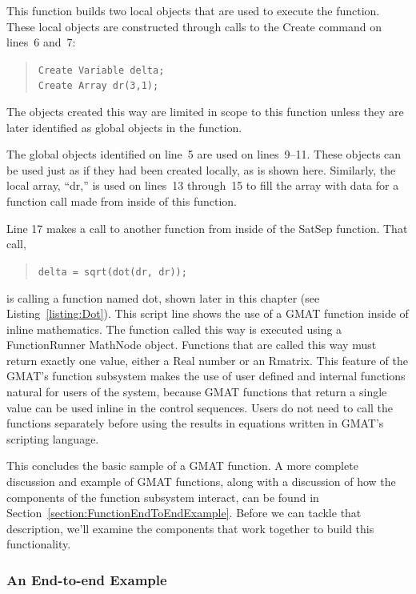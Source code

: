 This function builds two local objects that are used to execute the function.  These local objects
are constructed through calls to the Create command on lines~6 and~7:

\begin{quote}
\texttt{Create Variable delta;\\
Create Array  dr(3,1);}
\end{quote}

\noindent The objects created this way are limited in scope to this function unless they are later
identified as global objects in the function.

The global objects identified on line~5 are used on lines~9--11.  These objects can be used just as
if they had been created locally, as is shown here.  Similarly, the local array, ``dr,'' is used on
lines~13 through~15 to fill the array with data for a function call made from inside of this
function.

Line 17 makes a call to another function from inside of the SatSep function.  That call,

\begin{quote}
\texttt{delta = sqrt(dot(dr, dr));}
\end{quote}

\noindent is calling a function named dot, shown later in this chapter (see
Listing~\ref{listing:Dot}).  This script line shows the use of a GMAT function inside of inline
mathematics.  The function called this way is executed using a FunctionRunner MathNode object. 
Functions that are called this way must return exactly one value, either a Real number or an
Rmatrix.  This feature of the GMAT's function subsystem makes the use of user defined and
internal functions natural for users of the system, because GMAT functions that return a single
value can be used inline in the control sequences. Users do not need to call the functions
separately before using the results in equations written in GMAT's scripting language.

This concludes the basic sample of a GMAT function.  A more complete discussion and example of
GMAT functions, along with a discussion of how the components of the function subsystem interact,
can be found in Section~\ref{section:FunctionEndToEndExample}.  Before we can tackle that
description, we'll examine the components that work together to build this functionality.

\subsubsection{An End-to-end Example\label{section:FunctionEndToEndExample}}

